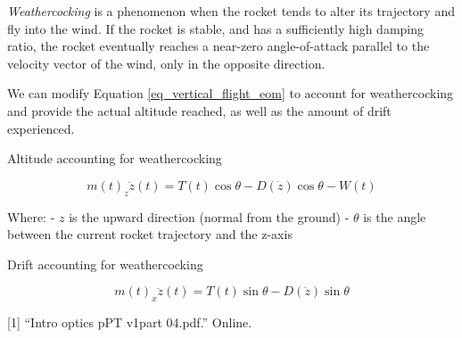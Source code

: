 \documentclass[]{article}
\begin{document}
\emph{Weathercocking} is a phenomenon when the rocket tends to alter its
trajectory and fly into the wind. If the rocket is stable, and has a
sufficiently high damping ratio, the rocket eventually reaches a
near-zero angle-of-attack parallel to the velocity vector of the wind,
only in the opposite direction.

We can modify Equation \ref{eq_vertical_flight_eom} to account for
weathercocking and provide the actual altitude reached, as well as the
amount of drift experienced.

Altitude accounting for weathercocking

\begin{equation}
\label{eq_vertical_angle}
m(t)_z\ddot{z}(t) = T(t) \cos \theta - D(\dot{z}) \cos \theta - W(t)
\end{equation}

Where: - \(z\) is the upward direction (normal from the ground) -
\(\theta\) is the angle between the current rocket trajectory and the
z-axis

Drift accounting for weathercocking

\begin{equation}
\label{eq_vertical_angle}
m(t)_x \ddot{z}(t) = T(t) \sin \theta - D(\dot{z}) \sin \theta 
\end{equation}

{[}1{]} ``Intro optics pPT v1part 04.pdf.'' Online.
\end{document}
